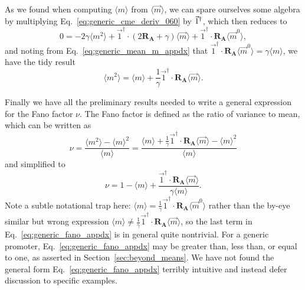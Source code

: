 As we found when computing $\langle{m}\rangle$ from $\langle\vec{m}\rangle$, we
can spare ourselves some algebra by multiplying
Eq.~\ref{eq:generic_cme_deriv_060} by $\vec{1}^\dagger$, which then reduces to
\begin{equation}
0 = - 2\gamma \langle{m}^2\rangle
+ \vec{1}^\dagger\cdot(2\mathbf{R_A} + \gamma) \langle\vec{m}\rangle
+ \vec{1}^\dagger\cdot\mathbf{R_A} \langle\vec{m}^0\rangle,
\end{equation}
and noting from Eq.~\ref{eq:generic_mean_m_appdx} that
$\vec{1}^\dagger\cdot\mathbf{R_A} \langle\vec{m}^0\rangle
= \gamma\langle{m}\rangle$, we have the tidy result
\begin{equation}
\langle{m}^2\rangle
= \langle{m}\rangle + \frac{1}{\gamma}
        \vec{1}^\dagger\cdot\mathbf{R_A} \langle\vec{m}\rangle.
\end{equation}

Finally we have all the preliminary results needed to write a general expression
for the Fano factor $\nu$. The Fano factor is defined as the ratio of variance
to mean, which can be written as
\begin{equation}
\nu = \frac{\langle{m}^2\rangle - \langle{m}\rangle^2}{\langle{m}\rangle}
= \frac{
    \langle{m}\rangle + \frac{1}{\gamma}
        \vec{1}^\dagger\cdot\mathbf{R_A} \langle\vec{m}\rangle
    - \langle{m}\rangle^2
    }{\langle{m}\rangle}
\end{equation}
and simplified to
\begin{equation}
\nu = 1 - \langle{m}\rangle
+ \frac{\vec{1}^\dagger\cdot \mathbf{R_A}\langle\vec{m}\rangle}
        {\gamma \langle{m}\rangle}.
\label{eq:generic_fano_appdx}
\end{equation}
Note a subtle notational trap here: $\langle{m}\rangle = \frac{1}{\gamma}
\vec{1}^\dagger\cdot\mathbf{R_A}\langle\vec{m}^0\rangle$ rather than the by-eye
similar but wrong expression $\langle{m}\rangle \ne \frac{1}{\gamma}
\vec{1}^\dagger\cdot\mathbf{R_A}\langle\vec{m}\rangle$, so the last term in
Eq.~\ref{eq:generic_fano_appdx} is in general quite nontrivial. For a generic
promoter, Eq.~\ref{eq:generic_fano_appdx} may be greater than, less than, or
equal to one, as asserted in Section~\ref{sec:beyond_means}. We have not found
the general form Eq.~\ref{eq:generic_fano_appdx} terribly intuitive and instead
defer discussion to specific examples.

